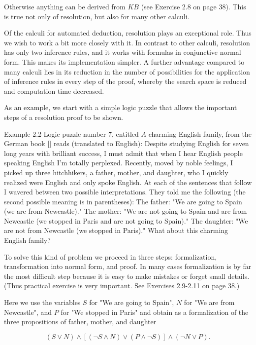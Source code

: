 \documentclass[10pt]{book}
\begin{document}
Otherwise anything can be derived from $K B$ (see Exercise 2.8 on page 38). This is true not only of resolution, but also for many other calculi.

Of the calculi for automated deduction, resolution plays an exceptional role. Thus we wish to work a bit more closely with it. In contrast to other calculi, resolution has only two inference rules, and it works with formulas in conjunctive normal form. This makes its implementation simpler. A further advantage compared to many calculi lies in its reduction in the number of possibilities for the application of inference rules in every step of the proof, whereby the search space is reduced and computation time decreased.

As an example, we start with a simple logic puzzle that allows the important steps of a resolution proof to be shown.

Example 2.2 Logic puzzle number 7, entitled $A$ charming English family, from the German book [\cite{berrondo1989fallgruben}] reads (translated to English):
Despite studying English for seven long years with brilliant success, I must admit that when I hear English people speaking English I'm totally perplexed. Recently, moved by noble feelings, I picked up three hitchhikers, a father, mother, and daughter, who I quickly realized were English and only spoke English. At each of the sentences that follow I wavered between two possible interpretations. They told me the following (the second possible meaning is in parentheses): The father: "We are going to Spain (we are from Newcastle)." The mother: "We are not going to Spain and are from Newcastle (we stopped in Paris and are not going to Spain)." The daughter: "We are not from Newcastle (we stopped in Paris)." What about this charming English family?

To solve this kind of problem we proceed in three steps: formalization, transformation into normal form, and proof. In many cases formalization is by far the most difficult step because it is easy to make mistakes or forget small details. (Thus practical exercise is very important. See Exercises 2.9-2.11 on page 38.)

Here we use the variables $S$ for "We are going to Spain", $N$ for "We are from Newcastle", and $P$ for "We stopped in Paris" and obtain as a formalization of the three propositions of father, mother, and daughter

$$
(S \vee N) \wedge[(\neg S \wedge N) \vee(P \wedge \neg S)] \wedge(\neg N \vee P) .
$$
\end{document}
